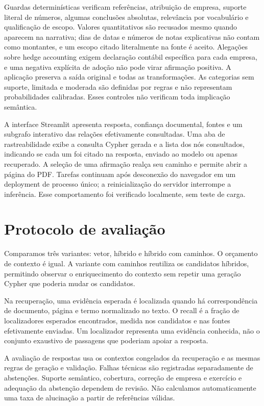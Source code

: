 \documentclass[conference]{IEEEtran}
\begin{document}
Guardas determinísticas verificam referências, atribuição de empresa, suporte literal de números, algumas conclusões absolutas, relevância por vocabulário e qualificação de escopo. Valores quantitativos são recusados mesmo quando aparecem na narrativa; dias de datas e números de notas explicativas não contam como montantes, e um escopo citado literalmente na fonte é aceito. Alegações sobre hedge accounting exigem declaração contábil específica para cada empresa, e uma negativa explícita de adoção não pode virar afirmação positiva. A aplicação preserva a saída original e todas as transformações. As categorias sem suporte, limitada e moderada são definidas por regras e não representam probabilidades calibradas. Esses controles não verificam toda implicação semântica.

A interface Streamlit apresenta resposta, confiança documental, fontes e um subgrafo interativo das relações efetivamente consultadas. Uma aba de rastreabilidade exibe a consulta Cypher gerada e a lista dos nós consultados, indicando se cada um foi citado na resposta, enviado ao modelo ou apenas recuperado. A seleção de uma afirmação realça seu caminho e permite abrir a página do PDF. Tarefas continuam após desconexão do navegador em um deployment de processo único; a reinicialização do servidor interrompe a inferência. Esse comportamento foi verificado localmente, sem teste de carga.

\section{Protocolo de avaliação}

Comparamos três variantes: vetor, híbrido e híbrido com caminhos. O orçamento de contexto é igual. A variante com caminhos reutiliza os candidatos híbridos, permitindo observar o enriquecimento do contexto sem repetir uma geração Cypher que poderia mudar os candidatos.

Na recuperação, uma evidência esperada é localizada quando há correspondência de documento, página e termo normalizado no texto. O recall é a fração de localizadores esperados encontrados, medida nos candidatos e nas fontes efetivamente enviadas. Um localizador representa uma evidência conhecida, não o conjunto exaustivo de passagens que poderiam apoiar a resposta.

A avaliação de respostas usa os contextos congelados da recuperação e as mesmas regras de geração e validação. Falhas técnicas são registradas separadamente de abstenções. Suporte semântico, cobertura, correção de empresa e exercício e adequação da abstenção dependem de revisão. Não calculamos automaticamente uma taxa de alucinação a partir de referências válidas.
\end{document}
